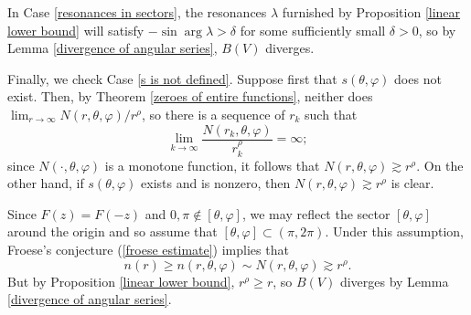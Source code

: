 \documentclass[reqno,12pt,letterpaper]{amsart}
\newcommand{\CC}{\mathbf{C}}
\DeclareMathOperator{\Res}{Res}
\theoremstyle{definition}
\begin{document}

In Case \ref{resonances in sectors},
the resonances $\lambda$ furnished by Proposition \ref{linear lower bound} will satisfy $-\sin \arg \lambda > \delta$ for some sufficiently small $\delta > 0$,
so by Lemma \ref{divergence of angular series}, $B(V)$ diverges.

Finally, we check Case \ref{s is not defined}.
Suppose first that $s(\theta, \varphi)$ does not exist. Then, by Theorem \ref{zeroes of entire functions}, neither does $\lim_{r \to \infty} N(r, \theta, \varphi)/r^\rho$, so there is a sequence of $r_k$ such that
$$\lim_{k \to \infty} \frac{N(r_k, \theta, \varphi)}{r_k^\rho} = \infty;$$
since $N(\cdot, \theta, \varphi)$ is a monotone function, it follows that $N(r, \theta, \varphi) \gtrsim r^\rho$.
On the other hand, if $s(\theta, \varphi)$ exists and is nonzero, then $N(r, \theta, \varphi) \gtrsim r^\rho$ is clear.

Since $F(z) = F(-z)$ and $0,\pi \notin [\theta, \varphi]$, we may reflect the sector $[\theta, \varphi]$ around the origin and so assume that $[\theta, \varphi] \subset (\pi, 2\pi)$.
Under this assumption, Froese's conjecture (\ref{froese estimate}) implies that
$$n(r) \geq n(r, \theta, \varphi) \sim N(r, \theta, \varphi) \gtrsim r^\rho.$$
But by Proposition \ref{linear lower bound}, $r^\rho \geq r$, so $B(V)$ diverges by Lemma \ref{divergence of angular series}.




\printbibliography
\end{document}
